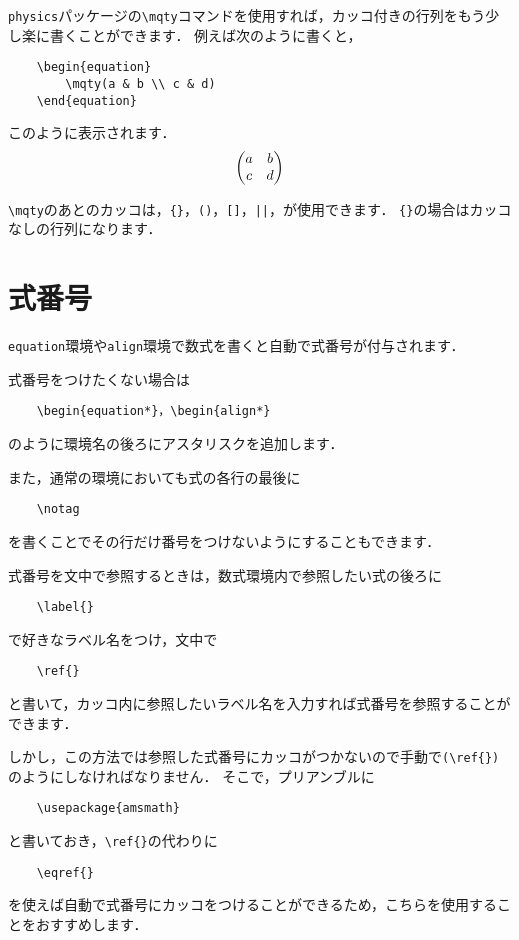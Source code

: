 \documentclass[a4paper, 11pt, uplatex]{jsreport}
\numberwithin{equation}{section}
\theoremstyle{definition}
\begin{document}
\verb|physics|パッケージの\verb|\mqty|コマンドを使用すれば，カッコ付きの行列をもう少し楽に書くことができます．
例えば次のように書くと，
\begin{verbatim}
    \begin{equation}
        \mqty(a & b \\ c & d)
    \end{equation}
\end{verbatim}
このように表示されます．
\begin{equation}
    \mqty(a & b \\ c & d)
\end{equation}

\verb|\mqty|のあとのカッコは，\verb|{}|，\verb|()|，\verb|[]|，\verb+||+，が使用できます\cite{physics}．
\verb|{}|の場合はカッコなしの行列になります．


\section{式番号}

\verb|equation|環境や\verb|align|環境で数式を書くと自動で式番号が付与されます．

式番号をつけたくない場合は
\begin{verbatim}
    \begin{equation*}，\begin{align*}
\end{verbatim}
のように環境名の後ろにアスタリスクを追加します．

また，通常の環境においても式の各行の最後に
\begin{verbatim}
    \notag
\end{verbatim}
を書くことでその行だけ番号をつけないようにすることもできます．

式番号を文中で参照するときは，数式環境内で参照したい式の後ろに
\begin{verbatim}
    \label{}
\end{verbatim}
で好きなラベル名をつけ，文中で
\begin{verbatim}
    \ref{}
\end{verbatim}
と書いて，カッコ内に参照したいラベル名を入力すれば式番号を参照することができます．

しかし，この方法では参照した式番号にカッコがつかないので手動で\verb|(\ref{})|のようにしなければなりません．
そこで，プリアンブルに
\begin{verbatim}
    \usepackage{amsmath}
\end{verbatim}
と書いておき，\verb|\ref{}|の代わりに
\begin{verbatim}
    \eqref{}
\end{verbatim}
を使えば自動で式番号にカッコをつけることができるため，こちらを使用することをおすすめします．
\end{document}
